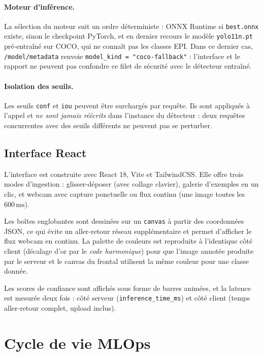 \documentclass[11pt,a4paper]{article}
\begin{document}
\paragraph{Moteur d'inférence.} La sélection du moteur suit un ordre
déterministe : ONNX Runtime si \texttt{best.onnx} existe, sinon le
checkpoint PyTorch, et en dernier recours le modèle \texttt{yolo11n.pt}
pré-entraîné sur COCO, qui ne connaît pas les classes EPI. Dans ce dernier
cas, \texttt{/model/metadata} renvoie \texttt{model\_kind =
"coco-fallback"} : l'interface et le rapport ne peuvent pas confondre ce
filet de sécurité avec le détecteur entraîné.

\paragraph{Isolation des seuils.} Les seuils \texttt{conf} et \texttt{iou}
peuvent être surchargés par requête. Ils sont appliqués à l'appel et
\emph{ne sont jamais réécrits} dans l'instance du détecteur : deux requêtes
concurrentes avec des seuils différents ne peuvent pas se perturber.

\subsection{Interface React}

L'interface est construite avec React 18, Vite et TailwindCSS. Elle offre
trois modes d'ingestion : glisser-déposer (avec collage clavier),
galerie d'exemples en un clic, et webcam avec capture ponctuelle ou flux
continu (une image toutes les \(600\,\mathrm{ms}\)).

Les boîtes englobantes sont dessinées sur un \texttt{canvas} à partir des
coordonnées JSON, ce qui évite un aller-retour réseau supplémentaire et
permet d'afficher le flux webcam en continu. La palette de couleurs est
reproduite à l'identique côté client (décalage d'or par le \emph{code harmonique})
pour que l'image annotée produite par le serveur et le canvas du frontal
utilisent la même couleur pour une classe donnée.

Les scores de confiance sont affichés sous forme de barres animées, et la
latence est mesurée deux fois : côté serveur (\texttt{inference\_time\_ms})
et côté client (temps aller-retour complet, upload inclus).

\section{Cycle de vie MLOps}
\end{document}
